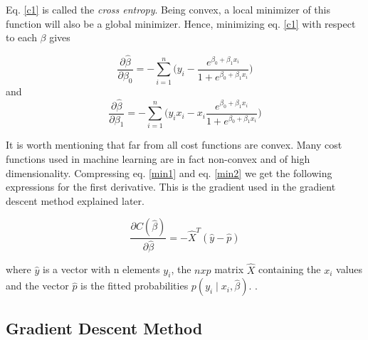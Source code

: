\documentclass[a4paper,11pt,twocolumn]{article}
\begin{document}
Eq. \eqref{c1} is called the \textit{cross entropy}. Being convex, a local minimizer of this function will also be a global minimizer. Hence, minimizing eq. \eqref{c1} with respect to each $\beta$ gives 


\begin{equation}
\frac{\partial\hat{\beta}}{\partial\beta_0}=
-\sum\limits_{i=1}^n\big(y_i-\frac{e^{\beta_0+\beta_1x_i}}{1+e^{\beta_0+\beta_1x_i}}\big)
\label{min1}
\end{equation}
and 
\begin{equation}
\frac{\partial\hat{\beta}}{\partial\beta_1}=
-\sum\limits_{i=1}^n\big(y_ix_i-x_i\frac{e^{\beta_0+\beta_1x_i}}{1+e^{\beta_0+\beta_1x_i}}\big)
\label{min2}
\end{equation}

It is worth mentioning that far from all cost functions are convex. Many cost functions used in machine learning are in fact non-convex and of high dimensionality. Compressing eq. \eqref{min1} and eq. \eqref{min2} we get the following expressions for the first derivative. This is the gradient used in the gradient descent method explained later.

\begin{equation}
\frac{\partial C(\hat{\beta})}{\partial\hat{\beta}}=-\hat{X}^T(\hat{y}-\hat{p})
\label{compcost1}
\end{equation}


where $\hat{y}$ is a vector with n elements $y_i$, the $n x p$ matrix $\hat{X}$ containing the $x_i$ values and the vector $\hat{p}$ is the fitted probabilities $p(y_i\mid x_i,\hat{\beta})$.
\cite{slides}. 

\subsection{Gradient Descent Method}
\end{document}
